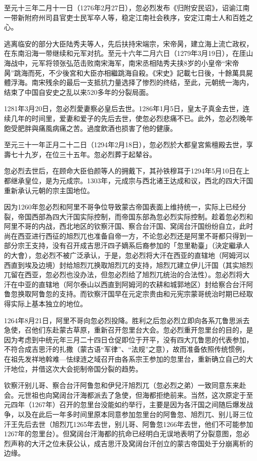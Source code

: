 至元十三年二月十一日（1276年2月27日），忽必烈发布《归附安民诏》，诏谕江南一带新附府州司县官吏士民军卒人等，稳定江南社会秩序，安定江南士人和百姓之心。

逃离临安的部分大臣陆秀夫等人，先后扶持宋端宗，宋帝昺，建立海上流亡政权，在东南沿海一带继续和元军对抗。至元十六年二月六日（1279年3月19日），在厓山海战中，元军将领张弘范击败南宋海军，南宋丞相陆秀夫挟8岁的小皇帝“宋帝昺”跳海而死，不少後宮和大臣亦相繼跳海自殺。《宋史》記載七日後，十餘萬具屍體浮海。南宋残余的最后一支抵抗力量选择了惨烈的终结，至此，元朝统一海内，结束了中国自安史之乱以来520多年的分裂局面。

1281年3月20日，忽必烈愛妻察必皇后去世。1286年1月5日，皇太子真金去世，连续几年的时间里，爱妻和爱子的先后去世，使忽必烈悲痛不已。此外，忽必烈晚年飽受肥胖與痛風病痛之苦。過度飲酒也损害了他的健康。

至元三十一年正月二十二日（1294年2月18日），忽必烈於大都皇宮紫檀殿去世，享壽七十九岁，在位三十五年。忽必烈葬于起辇谷。

忽必烈去世后，在顾命大臣伯颜等人的拥戴下，其孙铁穆耳于1294年5月10日在上都继承皇位，是为元成宗。1303年，元成宗与西北诸王达成和议，西北的四大汗国重新承认元朝的宗主国地位。

因为1260年忽必烈和阿里不哥争位导致蒙古帝国表面上维持统一，实际上已经分裂，帝国西部為四大汗国实际控制，而帝国东部為忽必烈实际控制。趁着忽必烈和阿里不哥的内战，西北地区的钦察汗国、察合台汗国、窝阔台汗国纷纷自立，此时尚在西亚进行西征的旭烈兀也准备自帝一方，不论忽必烈还是阿里不哥都只得到一部分宗王支持，没有召开成吉思汗四子嫡系后裔参加的「忽里勒臺」（決定繼承人的大會），忽必烈不被广泛承认，于是，忽必烈将大汗在西亚的直辖地（阿姆河以西直到埃及边境）封给旭烈兀换取旭烈兀的支持，旭烈兀建立伊儿汗国（其实旭烈兀留在西亚，忽必烈也没办法，但忽必烈给了旭烈兀统治的合法性）。忽必烈将大汗在中亚的直辖地（阿尔泰山以西直到阿姆河的农耕和城郭地区）封给察合台汗阿鲁忽换取阿鲁忽的支持。而钦察汗国早在元定宗贵由和元宪宗蒙哥统治时期已经取得实际上基本独立的地位。

1264年8月21日，阿里不哥向忽必烈投降。胜利之后忽必烈立即向各系兀鲁思派去急使，召他们东赴蒙古草原，重新召开忽里台大会。忽必烈重开忽里台的目的，是因为考虑到中统元年三月二十四日仓促即位于开平，没有四大兀鲁思的代表参加，不符合成吉思汗的扎撒（蒙古语“军律”、“法规”之意），故而准备依照传统惯例，在祖先发祥地斡难---怯绿涟之域召开由各系宗王参加的忽里台，重新确立自己的大汗地位，并借这次大会扼制帝国分裂的趋势。

钦察汗别儿哥、察合台汗阿鲁忽和伊兒汗旭烈兀（忽必烈之弟）一致同意东来赴会。元世祖也向窝阔台汗海都派去了急使，但海都拒绝前来。当然，这次原定于至元四年（1267年）召开的忽里台没能如约举行，主要是因为各汗国之间随后爆发战争，以及在此后一年多时间里原本同意参加忽里台的阿鲁忽、旭烈兀、别儿哥三位汗王先后去世（旭烈兀1265年去世，别儿哥、阿鲁忽1266年去世，他们不可能参加1267年的忽里台）。但窝阔台汗海都的抗命已经明白无误地表明了分裂意图，忽必烈声称的大汗之位未获公认，成吉思汗及窝阔台汗创立的蒙古帝国处于分崩离析的边缘。

